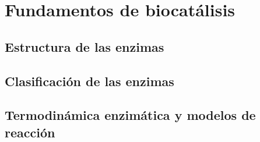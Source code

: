 \documentclass{AsignaturaResumen}
\begin{document}
    \frontmatter

\Portada
\Indices

    \mainmatter


\part{Fundamentos de biocatálisis}

    \chapter{Estructura de las enzimas} 
    \chapter{Clasificación de las enzimas} 
    \chapter{Termodinámica enzimática y modelos de reacción} 
    
%
%    
%


    \PlainGeom
    \appendix



    \backmatter

\Bibliografia
\Glosarios
\end{document}
